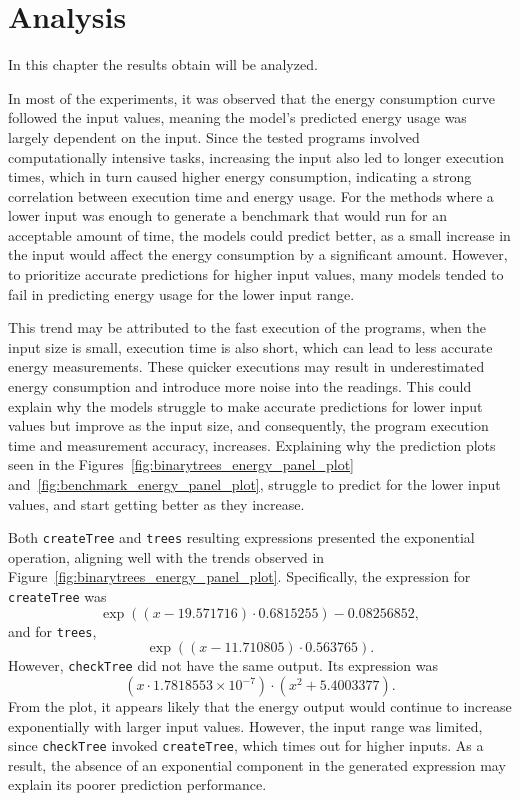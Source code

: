 \section{Analysis} \label{sec:analysis}


In this chapter the results obtain will be analyzed.


In most of the experiments, it was observed that the energy consumption curve followed the input values, meaning the model's predicted energy usage was largely dependent on the input. Since the tested programs involved computationally intensive tasks, increasing the input also led to longer execution times, which in turn caused higher energy consumption, indicating a strong correlation between execution time and energy usage. 
For the methods where a lower input was enough to generate a benchmark that would run for an acceptable amount of time, the models could predict better, as a small increase in the input would affect the energy consumption by a significant amount. However, to prioritize accurate predictions for higher input values, many models tended to fail in predicting energy usage for the lower input range. 

This trend may be attributed to the fast execution of the programs, when the input size is small, execution time is also short, which can lead to less accurate energy measurements. These quicker executions may result in underestimated energy consumption and introduce more noise into the readings. This could explain why the models struggle to make accurate predictions for lower input values but improve as the input size, and consequently, the program execution time and measurement accuracy, increases. Explaining why the prediction plots seen in the Figures~\ref{fig:binarytrees_energy_panel_plot} and~\ref{fig:benchmark_energy_panel_plot}, struggle to predict for the lower input values, and start getting better as they increase.

Both \texttt{createTree} and \texttt{trees} resulting expressions presented the exponential operation, aligning well with the trends observed in Figure~\ref{fig:binarytrees_energy_panel_plot}. Specifically, the expression for \texttt{createTree} was  
\[
\exp\left((x - 19.571716) \cdot 0.6815255\right) - 0.08256852,
\]  
and for \texttt{trees},  
\[
\exp\left((x - 11.710805) \cdot 0.563765\right).
\]  
However, \texttt{checkTree} did not have the same output. Its expression was  
\[
(x \cdot 1.7818553 \times 10^{-7}) \cdot \left(x^2 + 5.4003377\right).
\]  
From the plot, it appears likely that the energy output would continue to increase exponentially with larger input values. However, the input range was limited, since \texttt{checkTree} invoked \texttt{createTree}, which times out for higher inputs. As a result, the absence of an exponential component in the generated expression may explain its poorer prediction performance.

